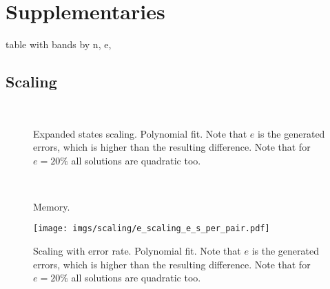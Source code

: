 \section{Supplementaries} \label{GLOBALsec:supplementaries}

table with bands by n, e, 

\subsection{Scaling}

\begin{figure}[H]
    \centering
    \\
    \caption{Expanded states scaling. Polynomial fit. Note that $e$ is the
      generated errors, which is higher than the resulting difference.
      Note that for $e=20\%$ all \A solutions are quadratic too.}
    \label{GLOBALfig:expanded_length_scaling}
\end{figure}

\begin{figure}[H]
    \centering
    \\
    \caption{Memory.}
    \label{GLOBALfig:memory_length_scaling}
\end{figure}

\begin{figure}[H]
    \centering
    \texttt{[image: imgs/scaling/e\_scaling\_e\_s\_per\_pair.pdf]}
    \caption{Scaling with error rate. Polynomial fit. Note that $e$ is the generated errors, which is higher than the resulting difference. Note that for $e=20\%$ all \A solutions are quadratic too.}
    \label{GLOBALfig:scaling_with_e}
\end{figure}


